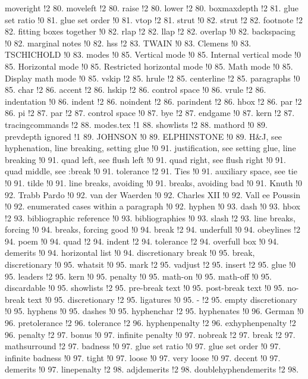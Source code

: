 moveright !2 80.
moveleft !2 80.
raise !2 80.
lower !2 80.
boxmaxdepth !2 81.
glue set ratio !0 81.
glue set order !0 81.
vtop !2 81.
strut !0 82.
strut !2 82.
footnote !2 82.
fitting boxes together !0 82.
rlap !2 82.
llap !2 82.
overlap !0 82.
backspacing !0 82.
marginal notes !0 82.
hss !2 83.
TWAIN !0 83.
Clemens !0 83.
TSCHICHOLD !0 83.
modes !0 85.
Vertical mode !0 85.
Internal vertical mode !0 85.
Horizontal mode !0 85.
Restricted horizontal mode !0 85.
Math mode !0 85.
Display math mode !0 85.
vskip !2 85.
hrule !2 85.
centerline !2 85.
paragraphs !0 85.
char !2 86.
accent !2 86.
hskip !2 86.
control space !0 86.
vrule !2 86.
indentation !0 86.
indent !2 86.
noindent !2 86.
parindent !2 86.
hbox !2 86.
par !2 86.
pi !2 87.
par !2 87.
control space !0 87.
bye !2 87.
endgame !0 87.
kern !2 87.
tracingcommands !2 88.
modes.tex !1 88.
showlists !2 88.
mathord !0 89.
prevdepth ignored !1 89.
JOHNSON !0 89.
ELPHINSTONE !0 89.
H\&J, see hyphenation, line breaking, setting glue !0 91.
justification, see setting glue, line breaking !0 91.
quad left, see flush left !0 91.
quad right, see flush right !0 91.
quad middle, see :break !0 91.
tolerance !2 91.
Ties !0 91.
auxiliary space, see tie !0 91.
tilde !0 91.
line breaks, avoiding !0 91.
breaks, avoiding bad !0 91.
Knuth !0 92.
Trabb Pardo !0 92.
van der Waerden !0 92.
Charles XII !0 92.
Vall{ e}e Poussin !0 92.
enumerated cases within a paragraph !0 92.
hyphen !0 93.
dash !0 93.
hbox !2 93.
bibliographic reference !0 93.
bibliographies !0 93.
slash !2 93.
line breaks, forcing !0 94.
breaks, forcing good !0 94.
break !2 94.
underfull !0 94.
obeylines !2 94.
poem !0 94.
quad !2 94.
indent !2 94.
tolerance !2 94.
overfull box !0 94.
demerits !0 94.
horizontal list !0 94.
discretionary break !0 95.
break, discretionary !0 95.
whatsit !0 95.
mark !2 95.
vadjust !2 95.
insert !2 95.
glue !0 95.
leaders !2 95.
kern !0 95.
penalty !0 95.
math-on !0 95.
math-off !0 95.
discardable !0 95.
showlists !2 95.
pre-break text !0 95.
post-break text !0 95.
no-break text !0 95.
discretionary !2 95.
ligatures !0 95.
- !2 95.
empty discretionary !0 95.
hyphens !0 95.
dashes !0 95.
hyphenchar !2 95.
hyphenates !0 96.
German !0 96.
pretolerance !2 96.
tolerance !2 96.
hyphenpenalty !2 96.
exhyphenpenalty !2 96.
penalty !2 97.
bonus !0 97.
infinite penalty !0 97.
nobreak !2 97.
break !2 97.
mathsurround !2 97.
badness !0 97.
glue set ratio !0 97.
glue set order !0 97.
infinite badness !0 97.
tight !0 97.
loose !0 97.
very loose !0 97.
decent !0 97.
demerits !0 97.
linepenalty !2 98.
adjdemerits !2 98.
doublehyphendemerits !2 98.
